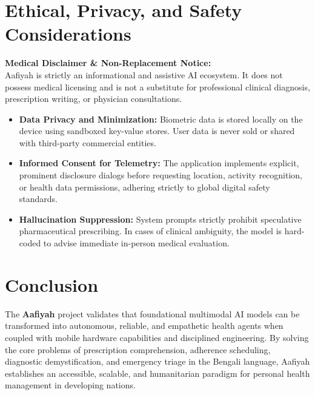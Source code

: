 \documentclass[12pt,a4paper,oneside]{report}
\begin{document}
\chapter{Ethical, Privacy, and Safety Considerations}

\begin{alertbox}
\textbf{Medical Disclaimer \& Non-Replacement Notice:}\\
Aafiyah is strictly an informational and assistive AI ecosystem. It does not possess medical licensing and is not a substitute for professional clinical diagnosis, prescription writing, or physician consultations.
\end{alertbox}

\begin{itemize}
    \item \textbf{Data Privacy and Minimization:} Biometric data is stored locally on the device using sandboxed key-value stores. User data is never sold or shared with third-party commercial entities.
    \item \textbf{Informed Consent for Telemetry:} The application implements explicit, prominent disclosure dialogs before requesting location, activity recognition, or health data permissions, adhering strictly to global digital safety standards.
    \item \textbf{Hallucination Suppression:} System prompts strictly prohibit speculative pharmaceutical prescribing. In cases of clinical ambiguity, the model is hard-coded to advise immediate in-person medical evaluation.
\end{itemize}

\chapter{Conclusion}

The \textbf{Aafiyah} project validates that foundational multimodal AI models can be transformed into autonomous, reliable, and empathetic health agents when coupled with mobile hardware capabilities and disciplined engineering. By solving the core problems of prescription comprehension, adherence scheduling, diagnostic demystification, and emergency triage in the Bengali language, Aafiyah establishes an accessible, scalable, and humanitarian paradigm for personal health management in developing nations.
\end{document}
